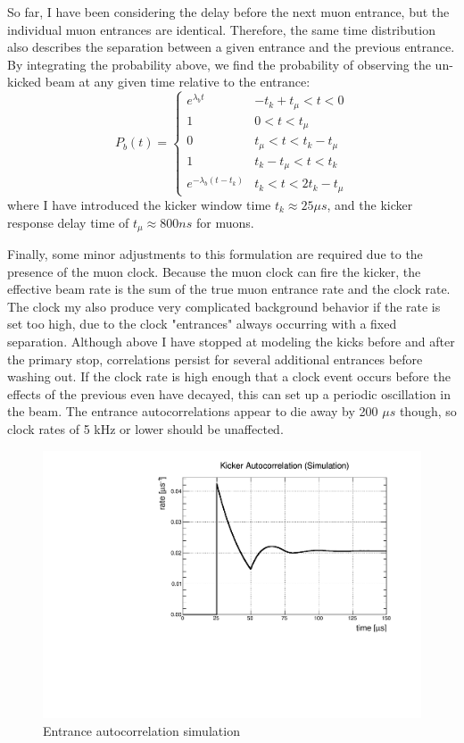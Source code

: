 So far, I have been considering the delay before the next muon entrance, but the individual muon entrances are identical.
Therefore, the same time distribution also describes the separation between a given entrance and the previous entrance.
By integrating the probability above, we find the probability of observing the un-kicked beam at any given time relative to the entrance:
\begin{equation}
P_b(t) = \begin{cases} e^{\lambda_b t}        & -t_k+t_{\mu}<t<0 \\
                       1                      & 0<t<t_{\mu} \\
                       0                      & t_{\mu}<t<t_k-t_{\mu} \\
                       1                      & t_k-t_{\mu}<t<t_k \\
                       e^{-\lambda_b (t-t_k)} & t_k<t<2 t_k-t_{\mu} \end{cases}
\label{eq:kicker}
\end{equation}
where I have introduced the kicker window time $t_k \approx 25 \mu s$, and the kicker response delay time of $t_{\mu} \approx 800 ns$ for muons.

Finally, some minor adjustments to this formulation are required due to the presence of the muon clock.
Because the muon clock can fire the kicker, the effective beam rate is the sum of the true muon entrance rate and the clock rate.
The clock my also produce very complicated background behavior if the rate is set too high, due to the clock "entrances" always occurring with a fixed separation.
Although above I have stopped at modeling the kicks before and after the primary stop, correlations persist for several additional entrances before washing out.
If the clock rate is high enough that a clock event occurs before the effects of the previous even have decayed, this can set up a periodic oscillation in the beam.
The entrance autocorrelations appear to die away by 200 $\mu s$ though, so clock rates of 5 kHz or lower should be unaffected.

\begin{figure}[h]
  \includegraphics[width=\textwidth]{beam/figures/KickAutoCorrSim.pdf}
  \caption{Entrance autocorrelation simulation}
  \label{fig:entrance_long}
\end{figure}

